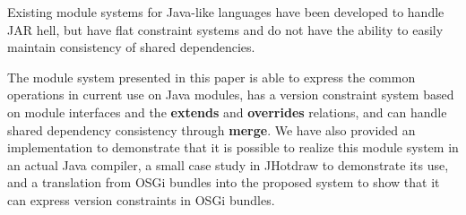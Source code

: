 Existing module systems for Java-like languages have been developed
to handle JAR hell, but have flat constraint systems and do not have the
ability to easily maintain consistency of shared dependencies.

The module system presented in this paper is able to express the common operations
in current use on Java modules, has a version constraint system based on module interfaces and
the \textbf{extends} and \textbf{overrides} relations, and can handle shared dependency 
consistency through \textbf{merge}. We have
also provided an implementation to demonstrate that it is
possible to realize this module system in an actual Java compiler, a small case study in JHotdraw
to demonstrate its use,
and a translation from OSGi bundles into the proposed system to show that it can express version
constraints in OSGi bundles.
